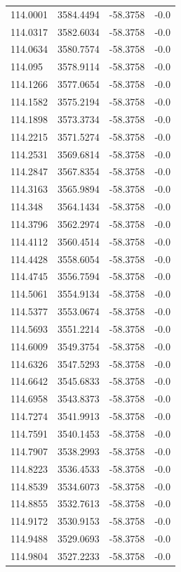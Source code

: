 \begin{table}[H]
\begin{tabular}{llll}
114.0001 & 3584.4494 & -58.3758 & -0.0 \\
114.0317 & 3582.6034 & -58.3758 & -0.0 \\
114.0634 & 3580.7574 & -58.3758 & -0.0 \\
114.095 & 3578.9114 & -58.3758 & -0.0 \\
114.1266 & 3577.0654 & -58.3758 & -0.0 \\
114.1582 & 3575.2194 & -58.3758 & -0.0 \\
114.1898 & 3573.3734 & -58.3758 & -0.0 \\
114.2215 & 3571.5274 & -58.3758 & -0.0 \\
114.2531 & 3569.6814 & -58.3758 & -0.0 \\
114.2847 & 3567.8354 & -58.3758 & -0.0 \\
114.3163 & 3565.9894 & -58.3758 & -0.0 \\
114.348 & 3564.1434 & -58.3758 & -0.0 \\
114.3796 & 3562.2974 & -58.3758 & -0.0 \\
114.4112 & 3560.4514 & -58.3758 & -0.0 \\
114.4428 & 3558.6054 & -58.3758 & -0.0 \\
114.4745 & 3556.7594 & -58.3758 & -0.0 \\
114.5061 & 3554.9134 & -58.3758 & -0.0 \\
114.5377 & 3553.0674 & -58.3758 & -0.0 \\
114.5693 & 3551.2214 & -58.3758 & -0.0 \\
114.6009 & 3549.3754 & -58.3758 & -0.0 \\
114.6326 & 3547.5293 & -58.3758 & -0.0 \\
114.6642 & 3545.6833 & -58.3758 & -0.0 \\
114.6958 & 3543.8373 & -58.3758 & -0.0 \\
114.7274 & 3541.9913 & -58.3758 & -0.0 \\
114.7591 & 3540.1453 & -58.3758 & -0.0 \\
114.7907 & 3538.2993 & -58.3758 & -0.0 \\
114.8223 & 3536.4533 & -58.3758 & -0.0 \\
114.8539 & 3534.6073 & -58.3758 & -0.0 \\
114.8855 & 3532.7613 & -58.3758 & -0.0 \\
114.9172 & 3530.9153 & -58.3758 & -0.0 \\
114.9488 & 3529.0693 & -58.3758 & -0.0 \\
114.9804 & 3527.2233 & -58.3758 & -0.0 \\

\end{tabular}
\end{table}

